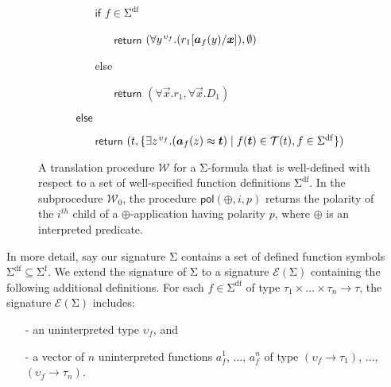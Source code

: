 \documentclass[runningheads,a4paper]{llncs}
\newcommand{\con}[1]{\mathsf{#1}}
\let\oldSigma=\Sigma
\def\Sigma{\mathrm{\oldSigma}}
\newcommand{\teq}{\approx}
\newcommand{\terms}{\mathcal{T}}
\newcommand{\conv}{\mathcal{W}}
\newcommand{\sfuns}[1]{#1^\mathrm{f}}
\newcommand{\sfundefs}[1]{#1^\mathrm{df}}
\newcommand{\pol}{\con{pol}}
\newcommand{\boolop}{\oplus}
\newcommand{\farg}[1]{a_{#1}}
\newcommand{\vecfarg}[1]{\vec{a}_{#1}}
\newcommand{\fargsort}[1]{\upsilon_{#1}}
\newcommand{\extendsig}[1]{\mathcal{E}( #1 )}
\newcommand{\vthinspace}{\kern+0.083333em}
\newcommand{\typ}[1]{^{\vthinspace #1}}
\begin{document}
\begin{figure}[t]
\begin{enumerate}
\begin{itemize}
\begin{itemize}
      \item[] $\mathsf{if}$ $f \in \sfundefs{\Sigma}$
      \begin{itemize}
        \item[] $\mathsf{return}$ $( \forall y\typ{\fargsort{f}}. ( r_1 [ \vecfarg{f}( y ) / \vec x ] ), \emptyset )$
      \end{itemize}
      \item[] else
      \begin{itemize}
        \item[] $\mathsf{return}$ $( \forall \vec x. r_1, \forall \vec x. D_1 )$
      \end{itemize}
    \end{itemize}
   \item[] $\mathsf{else}$
   \begin{itemize}
     \item[] $\mathsf{return}$ $( t, \{ \exists z\typ{\fargsort{f}}. ( \vecfarg{f}( z ) \teq \vec t ) \mid f( \vec t ) \in \terms( t ), f \in \sfundefs{\Sigma} \} )$
   \end{itemize}
 \end{itemize}
\end{enumerate}
\vspace{-2ex}
\caption{A translation procedure $\conv$ for a $\Sigma$-formula that is well-defined with respect to a set of well-specified function definitions $\sfundefs{\Sigma}$.
In the subprocedure $\conv_0$, the procedure $\pol( \boolop, i, p )$ returns the polarity of the $i^{th}$ child of a $\boolop$-application having polarity $p$,
where $\boolop$ is an interpreted predicate.
}
\label{fig:encoding}
\end{figure}

In more detail, 
say our signature $\Sigma$ contains a set of defined function symbols $\sfundefs{\Sigma} \subseteq \sfuns{\Sigma}$.
We extend the signature of $\Sigma$ to a signature $\extendsig{\Sigma}$ containing the following additional definitions.
For each $f \in \sfundefs{\Sigma}$ of type $\tau_1 \times \ldots \times \tau_n \rightarrow \tau$, 
the signature $\extendsig{\Sigma}$ includes:
\begin{enumerate}
\item[-] an uninterpreted type $\fargsort{f}$, and
\item[-] a vector of $n$ uninterpreted functions $\farg{f}^1$, $\ldots$, $\farg{f}^n$ of type $(\fargsort{f} \rightarrow \tau_1)$, $\ldots$, $(\fargsort{f} \rightarrow \tau_n)$.
\end{enumerate}
\end{document}
